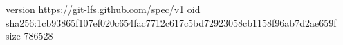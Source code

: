 version https://git-lfs.github.com/spec/v1
oid sha256:1cb93865f107ef020c654fac7712c617c5bd72923058cb1158f96ab7d2ae659f
size 786528
